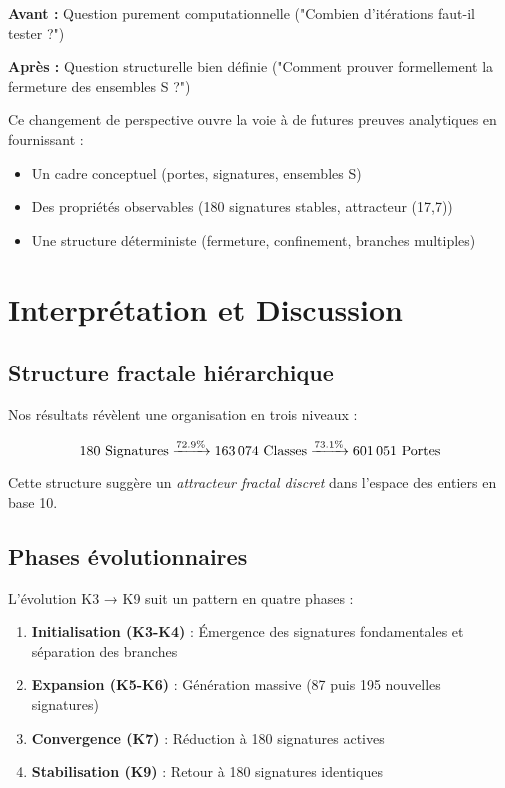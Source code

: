 \documentclass[12pt,a4paper]{article}
\theoremstyle{remark}
\begin{document}
\textbf{Avant :} Question purement computationnelle ("Combien d'itérations faut-il tester ?")

\textbf{Après :} Question structurelle bien définie ("Comment prouver formellement la fermeture des ensembles S ?")

Ce changement de perspective ouvre la voie à de futures preuves analytiques en fournissant :
\begin{itemize}
\item Un cadre conceptuel (portes, signatures, ensembles S)
\item Des propriétés observables (180 signatures stables, attracteur (17,7))
\item Une structure déterministe (fermeture, confinement, branches multiples)
\end{itemize}


\section{Interprétation et Discussion}
\label{sec:interpretation}

\subsection{Structure fractale hiérarchique}

Nos résultats révèlent une organisation en trois niveaux :

\begin{equation}
\text{180 Signatures} \xrightarrow{72.9\%} \text{163\,074 Classes} \xrightarrow{73.1\%} \text{601\,051 Portes}
\end{equation}

Cette structure suggère un \textit{attracteur fractal discret} dans l'espace des entiers en base 10.

\subsection{Phases évolutionnaires}

L'évolution K3 → K9 suit un pattern en quatre phases :

\begin{enumerate}
\item \textbf{Initialisation (K3-K4)} : Émergence des signatures fondamentales et séparation des branches
\item \textbf{Expansion (K5-K6)} : Génération massive (87 puis 195 nouvelles signatures)
\item \textbf{Convergence (K7)} : Réduction à 180 signatures actives
\item \textbf{Stabilisation (K9)} : Retour à 180 signatures identiques
\end{enumerate}
\end{document}
